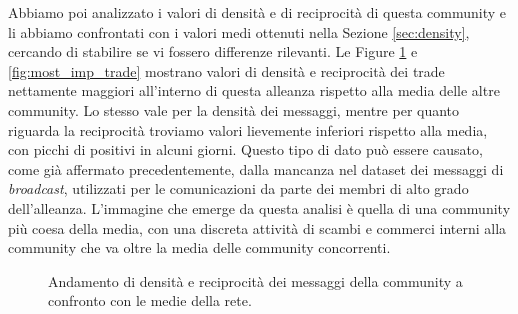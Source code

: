 Abbiamo poi analizzato i valori di densità e di reciprocità di questa community e li abbiamo confrontati con i valori medi ottenuti nella Sezione \ref{sec:density}, cercando di stabilire se vi fossero differenze rilevanti. Le Figure \ref{fig:most_imp_mess} e \ref{fig:most_imp_trade} mostrano valori di densità e reciprocità dei trade nettamente maggiori all'interno di questa alleanza rispetto alla media delle altre community. Lo stesso vale per la densità dei messaggi, mentre per quanto riguarda la reciprocità troviamo valori lievemente inferiori rispetto alla media, con picchi di positivi in alcuni giorni. Questo tipo di dato può essere causato, come già affermato precedentemente, dalla mancanza nel dataset dei messaggi di \textit{broadcast}, utilizzati per le comunicazioni da parte dei membri di alto grado dell'alleanza. L'immagine che emerge da questa analisi è quella di una community più coesa della media, con una discreta attività di scambi e commerci interni alla community che va oltre la media delle community concorrenti.
\begin{figure}
	\hfill
	\caption{Andamento di densità e reciprocità dei messaggi della community a confronto con le medie della rete.}
	\label{fig:most_imp_mess}
\end{figure}
